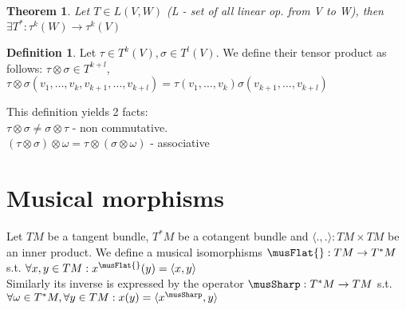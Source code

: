 \documentclass[a4paper, 11pt]{article}
\newcommand{\innerproduct}[2]{\langle #1, #2 \rangle}
\newtheorem{theorem}{Theorem}
\theoremstyle{definition}
\newtheorem{definition}{Definition}[section]
\begin{document}
\begin{theorem}
	Let $T \in L(V, W)$ (L - set of all linear op. from V to W), then
	$\exists T^*: \tau^k(W) \rightarrow \tau^k(V)$
\end{theorem}

\begin{definition}
	Let $\tau \in T^k(V), \sigma \in T^l(V)$. We define their tensor product as follows:
	$\tau \otimes \sigma \in T^{k+l}$,  \\
	$\tau \otimes \sigma(v_1, \dots, v_k, v_{k+1}, \dots, v_{k+l}) = \tau(v_1, \dots, v_k)\sigma(v_{k+1}, \dots, v_{k+l})$
\end{definition}

This definition yields 2 facts: \\
$\tau \otimes \sigma \neq \sigma \otimes \tau$ - non commutative. \\
$(\tau \otimes \sigma) \otimes \omega = \tau \otimes (\sigma \otimes \omega)$ - associative

\section{Musical morphisms}
Let $TM$ be a tangent bundle, $T^*M$ be a cotangent bundle and $\innerproduct{.}{.}: TM \times TM$ be an inner product. We define a musical isomorphisms $\musFlat{}: TM \rightarrow T^*M$ s.t. $\forall x, y \in TM: x^{\musFlat{}}(y) = \innerproduct{x}{y}$ \\
Similarly its inverse is expressed by the operator $\musSharp: T^*M \rightarrow TM$ s.t. $\forall \omega \in T^*M, \forall y \in TM: x(y) = \innerproduct{x^{\musSharp}}{y}$

%
\end{document}
